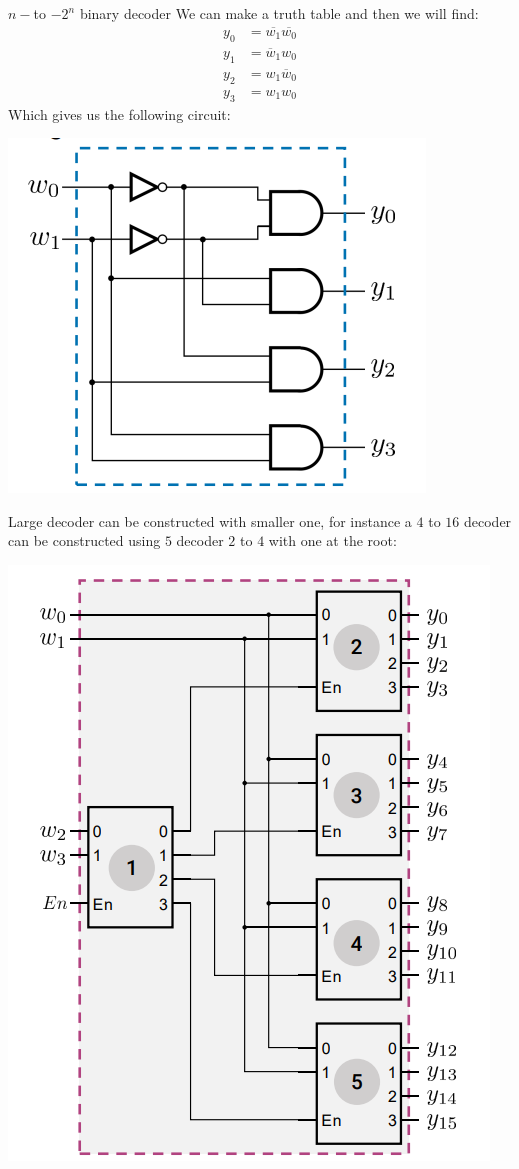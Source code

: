 \begin{parag}{$n-$to $-2^n$ binary decoder}
We can make a truth table and then we will find:
\begin{align*} 
    y_0 &= \overline{w_1} \overline{w_0}\\
    y_1 &= \overline{w}_1w_0\\
    y_2 &= w_1 \overline{w}_0\\
    y_3 &= w_1w_0
\end{align*}
Which gives us the following circuit:
\begin{center}
    \includegraphics[scale=0.6]{72025-06-20.png}
\end{center}
\begin{framedremark}
Large decoder can be constructed with smaller one, for instance a $4$ to $16$ decoder can be constructed using $5$ decoder $2$ to $4$ with one at the root:
\begin{center}
    \includegraphics[scale=0.6]{82025-06-20.png}
\end{center}


\end{framedremark}
\end{parag}
